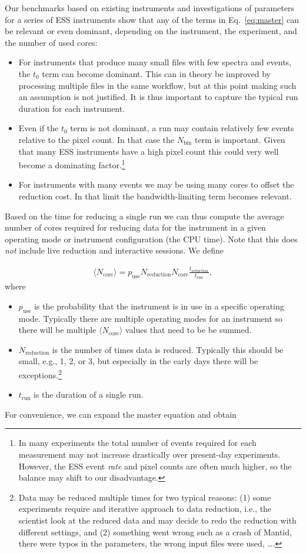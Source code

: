 \documentclass[a4paper,english,numbers=noenddot,bibliography=totoc,chapterprefix=on,DIV=12]{scrartcl}
\newcommand{\Treduction}{t_{\text{reduction}}}
\newcommand{\Trun}{t_{\text{run}}}
\newcommand{\Nbin}{N_{\text{bin}}}
\newcommand{\Ncore}{N_{\text{core}}}
\newcommand{\Ncoremean}{\langle N_{\text{core}}\rangle}
\newcommand{\Nreduction}{N_{\text{reduction}}}
\newcommand{\mantid}{Mantid\xspace}
\begin{document}
Our benchmarks based on existing instruments and investigations of parameters for a series of ESS instruments show that any of the terms in Eq.~\eqref{eq:master} can be relevant or even dominant, depending on the instrument, the experiment, and the number of used cores:

\begin{itemize}
  \item
    For instruments that produce many small files with few spectra and events, the $t_0$ term can become dominant.
    This can in theory be improved by processing multiple files in the same workflow, but at this point making such an assumption is not justified.
    It is thus important to capture the typical run duration for each instrument.
  \item
    Even if the $t_0$ term is not dominant, a run may contain relatively few events relative to the pixel count.
    In that case the $\Nbin$ term is important.
    Given that many ESS instruments have a high pixel count this could very well become a dominating factor.\footnote{In many experiments the total number of events required for each measurement may not increase drastically over present-day experiments. However, the ESS event \emph{rate} and pixel counts are often much higher, so the balance may shift to our disadvantage.}
  \item
    For instruments with many events we may be using many cores to offset the reduction cost.
    In that limit the bandwidth-limiting term becomes relevant.
\end{itemize}

Based on the time for reducing a single run we can thus compute the average number of cores required for reducing data for the instrument in a given operating mode or instrument configuration (the CPU time).
Note that this does \emph{not} include live reduction and interactive sessions.
We define

\begin{align}
  \Ncoremean = p_{\text{use}}\Nreduction \Ncore \frac{\Treduction}{\Trun},
\end{align}
where

\begin{itemize}
  \item $p_{\text{use}}$ is the probability that the instrument is in use in a specific operating mode.
  Typically there are multiple operating modes for an instrument so there will be multiple $\Ncoremean$ values that need to be be summed.
  \item $\Nreduction$ is the number of times data is reduced.
    Typically this should be small, e.g., 1, 2, or 3, but especially in the early days there will be exceptions.\footnote{Data may be reduced multiple times for two typical reasons: (1) some experiments require and iterative approach to data reduction, i.e., the scientist look at the reduced data and may decide to redo the reduction with different settings, and (2) something went wrong such as a crash of \mantid, there were typos in the parameters, the wrong input files were used, \dots.}
  \item $\Trun$ is the duration of a single run.
\end{itemize}
For convenience, we can expand the master equation and obtain
\end{document}
